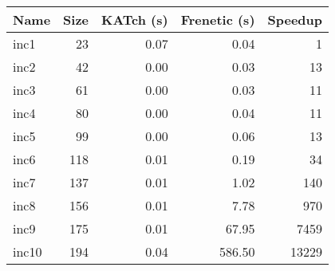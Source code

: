 \begin{tabular}{lrrrr}
\toprule
Name & Size & KATch (s) & Frenetic (s) & Speedup \\
\midrule
inc1 & 23 & 0.07 & 0.04 & 1 \\
inc2 & 42 & 0.00 & 0.03 & 13 \\
inc3 & 61 & 0.00 & 0.03 & 11 \\
inc4 & 80 & 0.00 & 0.04 & 11 \\
inc5 & 99 & 0.00 & 0.06 & 13 \\
inc6 & 118 & 0.01 & 0.19 & 34 \\
inc7 & 137 & 0.01 & 1.02 & 140 \\
inc8 & 156 & 0.01 & 7.78 & 970 \\
inc9 & 175 & 0.01 & 67.95 & 7459 \\
inc10 & 194 & 0.04 & 586.50 & 13229 \\
\bottomrule
\end{tabular}
